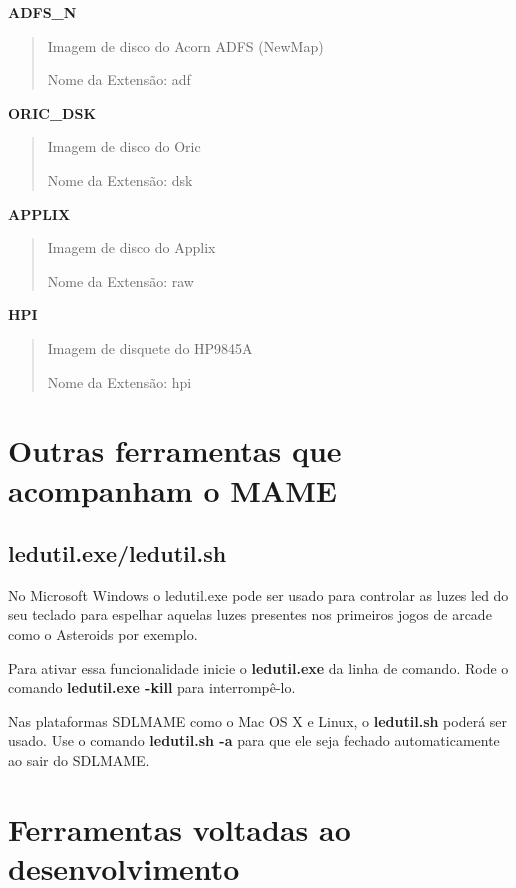 \documentclass[letterpaper,10pt,brazil]{sphinxmanual}
\begin{document}
\textbf{ADFS\_N}
\begin{quote}

Imagem de disco do Acorn ADFS (NewMap)

Nome da Extensão: adf
\end{quote}

\textbf{ORIC\_DSK}
\begin{quote}

Imagem de disco do Oric

Nome da Extensão: dsk
\end{quote}

\textbf{APPLIX}
\begin{quote}

Imagem de disco do Applix

Nome da Extensão: raw
\end{quote}

\textbf{HPI}
\begin{quote}

Imagem de disquete do HP9845A

Nome da Extensão: hpi
\end{quote}


\section{Outras ferramentas que acompanham o MAME}
\label{tools/othertools:outras-ferramentas-que-acompanham-o-mame}\label{tools/othertools::doc}

\subsection{ledutil.exe/ledutil.sh}
\label{tools/othertools:ledutil-exe-ledutil-sh}
No Microsoft Windows o ledutil.exe pode ser usado para controlar as luzes
led do seu teclado para espelhar aquelas luzes presentes nos primeiros
jogos de arcade como o Asteroids por exemplo.

Para ativar essa funcionalidade inicie o \textbf{ledutil.exe} da linha de
comando. Rode o comando \textbf{ledutil.exe -kill} para interrompê-lo.

Nas plataformas SDLMAME como o Mac OS X e Linux, o \textbf{ledutil.sh} poderá
ser usado. Use o comando \textbf{ledutil.sh -a} para que ele seja fechado
automaticamente ao sair do SDLMAME.


\section{Ferramentas voltadas ao desenvolvimento}
\label{tools/othertools:ferramentas-voltadas-ao-desenvolvimento}
\end{document}
